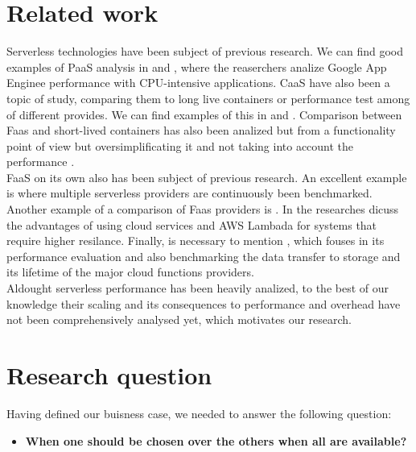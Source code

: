 \documentclass[11pt]{article}
\begin{document}
\section{Related work}

Serverless technologies have been subject of previous research. We can find good examples of PaaS analysis in \cite{googleappengine} and \cite{googleappengine2}, where the reaserchers analize Google App Enginee performance with CPU-intensive applications. CaaS have also been a topic of study, comparing them to long live containers or performance test among of different provides. We can find examples of this in \cite{cc} and \cite{dd}. Comparison between Faas and short-lived containers has also been analized but from a functionality point of view but oversimplificating it and not taking into account the performance \cite{ee}\cite{ff}\cite{gg}. \\
 
FaaS on its own also has been subject of previous research. An excellent example is \cite{aa} where multiple serverless providers are continuously been benchmarked. Another example of a comparison of Faas providers is \cite{bb}. In \cite{14} the researches dicuss the advantages of using cloud services and AWS Lambada for systems that require higher resilance. Finally, is necessary to mention \cite{https://sci-hub.se/10.1002/cpe.4792}, which fouses in its performance evaluation and also benchmarking the data transfer to storage and its lifetime of the major cloud functions providers.  \\

Aldought serverless performance has been heavily analized, to the best of our knowledge their scaling and its consequences to performance and overhead have not been comprehensively analysed yet, which motivates our research.



\section{Research question}
Having defined our buisness case, we needed to answer the following question:

\begin{itemize}
\item \textbf{When one should be chosen over the others when all are available?}
\end{itemize}
\end{document}
